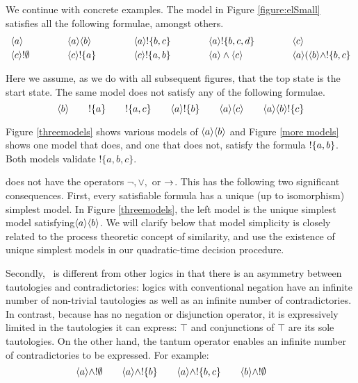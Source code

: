 We continue with concrete examples.  The model in Figure
\ref{figure:elSmall} satisfies all the following formulae, amongst
others.
\[
\begin{array}{lclclclcl}
\MAY{a} &\qquad&
\MAY{a} \MAY{b} &\qquad&
\MAY{a} \fBang \{b,c\} &\qquad&
\MAY{a} \fBang \{b,c,d\} &\qquad&
\MAY{c} \\[1mm]
\MAY{c} \fBang \emptyset &&
\MAY{c} \fBang \{a\} &&
\MAY{c} \fBang \{a,b\} &&
\MAY{a} \land \MAY{c} &&
\MAY{a} (\MAY{b} \land \fBang \{b,c\}
\end{array}
\]

\NI Here we assume, as we do with all subsequent figures, that the top
state is the start state.  The same model does not satisfy any of the
following formulae.
\[
\langle b \rangle \qquad
! \{a\} \qquad
! \{a, c\} \qquad
\langle a \rangle ! \{b\} \qquad
\langle a \rangle \langle c \rangle \qquad
\langle a \rangle \langle b \rangle ! \{c\} 
\]

\NI Figure \ref{threemodels} shows various models of $\MAY{a} \MAY{b}$
and Figure \ref{more models} shows one model that does, and one that
does not, satisfy the formula $! \{a,b\}$.  Both models validate
$!\{a, b, c\}$.

\Cathoristic{} does not have the operators $\neg, \lor, $ or
$\rightarrow$.  This has the following two significant consequences.
First, every satisfiable formula has a unique (up to isomorphism)
simplest model.  In Figure \ref{threemodels}, the left model is the
unique simplest model satisfying$\MAY{a} \MAY{b}$.  We will clarify
below that model simplicity is closely related to the process
theoretic concept of similarity, and use the existence of unique
simplest models in our quadratic-time decision procedure.





Secondly, \cathoristic\  is different from other logics in that there is an
asymmetry between tautologies and contradictories: logics with
conventional negation have an infinite number of non-trivial
tautologies as well as an infinite number of contradictories.  In
contrast, because \cathoristic{} has no negation or disjunction
operator, it is expressively limited in the tautologies it can
express: $\top$ and conjunctions of $\top$ are its sole tautologies. On the
other hand, the tantum operator enables an infinite number of
contradictories to be expressed.  For example:
\[
   \langle a \rangle \land ! \emptyset \qquad
   \langle a \rangle \land ! \{b\} \qquad
   \langle a \rangle \land ! \{b, c\} \qquad
   \langle b \rangle \land ! \emptyset \qquad
\]


